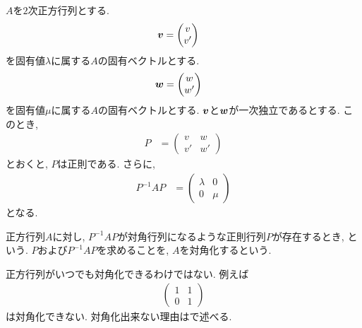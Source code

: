 $A$を$2$次正方行列とする.
  \begin{align*}
    \boldsymbol{v}&=\begin{pmatrix}v\\v'\end{pmatrix}
  \end{align*}
  を固有値$\lambda$に属する$A$の固有ベクトルとする.
  \begin{align*}
    \boldsymbol{w}&=\begin{pmatrix}w\\w'\end{pmatrix}
  \end{align*}
  を固有値$\mu$に属する$A$の固有ベクトルとする.
  $\boldsymbol{v}$と$\boldsymbol{w}$が一次独立であるとする.
  このとき,
  \begin{align*}
    P&=\begin{pmatrix}v&w\\v'&w'\end{pmatrix}
  \end{align*}
  とおくと, $P$は正則である.
  さらに,
  \begin{align*}
    P^{-1}AP&=\begin{pmatrix}\lambda&0\\0&\mu\end{pmatrix}
  \end{align*}
  となる.
\begin{remark}
  正方行列$A$に対し,
  $P^{-1}AP$が対角行列になるような正則行列$P$が存在するとき,
  という.
  $P$および$P^{-1}AP$を求めることを,
  $A$を対角化するという.
\end{remark}
\begin{remark}
  正方行列がいつでも対角化できるわけではない.
  例えば
  \begin{align*}
    \begin{pmatrix}1&1\\0&1\end{pmatrix}
  \end{align*}
  は対角化できない. 対角化出来ない理由はで述べる.
\end{remark}


